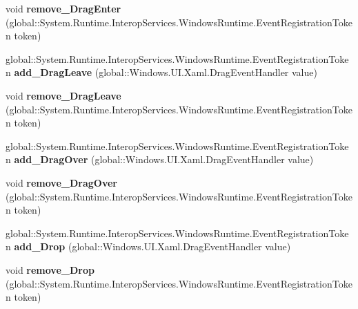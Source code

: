 \begin{DoxyCompactItemize}
void {\bfseries remove\+\_\+\+Drag\+Enter} (global\+::\+System.\+Runtime.\+Interop\+Services.\+Windows\+Runtime.\+Event\+Registration\+Token token)
\item 
\mbox{\label{interface_windows_1_1_u_i_1_1_xaml_1_1_i_u_i_element_ad7eb2baf580fcb2515afa4af987599d4}} 
global\+::\+System.\+Runtime.\+Interop\+Services.\+Windows\+Runtime.\+Event\+Registration\+Token {\bfseries add\+\_\+\+Drag\+Leave} (global\+::\+Windows.\+U\+I.\+Xaml.\+Drag\+Event\+Handler value)
\item 
\mbox{\label{interface_windows_1_1_u_i_1_1_xaml_1_1_i_u_i_element_ad457a93ec08cee7b4f4b038673af7df0}} 
void {\bfseries remove\+\_\+\+Drag\+Leave} (global\+::\+System.\+Runtime.\+Interop\+Services.\+Windows\+Runtime.\+Event\+Registration\+Token token)
\item 
\mbox{\label{interface_windows_1_1_u_i_1_1_xaml_1_1_i_u_i_element_a6deb1e61adbba0617ff0428e75ee83da}} 
global\+::\+System.\+Runtime.\+Interop\+Services.\+Windows\+Runtime.\+Event\+Registration\+Token {\bfseries add\+\_\+\+Drag\+Over} (global\+::\+Windows.\+U\+I.\+Xaml.\+Drag\+Event\+Handler value)
\item 
\mbox{\label{interface_windows_1_1_u_i_1_1_xaml_1_1_i_u_i_element_a3fe57bf41ebbf92eca2afbd6cf17c63f}} 
void {\bfseries remove\+\_\+\+Drag\+Over} (global\+::\+System.\+Runtime.\+Interop\+Services.\+Windows\+Runtime.\+Event\+Registration\+Token token)
\item 
\mbox{\label{interface_windows_1_1_u_i_1_1_xaml_1_1_i_u_i_element_a1aa925e3d35192dcae38b8299243b5f4}} 
global\+::\+System.\+Runtime.\+Interop\+Services.\+Windows\+Runtime.\+Event\+Registration\+Token {\bfseries add\+\_\+\+Drop} (global\+::\+Windows.\+U\+I.\+Xaml.\+Drag\+Event\+Handler value)
\item 
\mbox{\label{interface_windows_1_1_u_i_1_1_xaml_1_1_i_u_i_element_a8138853a5ec389ca042bd806a4488df2}} 
void {\bfseries remove\+\_\+\+Drop} (global\+::\+System.\+Runtime.\+Interop\+Services.\+Windows\+Runtime.\+Event\+Registration\+Token token)

\end{DoxyCompactItemize}
